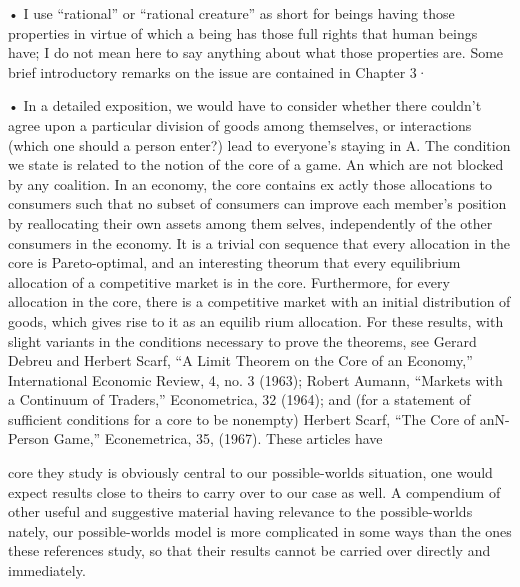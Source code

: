 \documentclass[11pt,openany]{book}
\begin{document}
{• I use ``rational'' or ``rational creature'' as short for beings having those properties in virtue of which a being has those full rights that human beings have; I do not mean here to say anything about what those properties are. Some brief introductory remarks on the issue are contained in Chapter 3·\par

• In a detailed exposition, we would have to consider whether there couldn't agree upon a particular division of goods among themselves, or interactions (which one should a person enter?) lead to everyone's staying in A. The condition we state is related to the notion of the core of a game. An which are not blocked by any coalition. In an economy, the core contains ex actly those allocations to consumers such that no subset of consumers can improve each member's position by reallocating their own assets among them selves, independently of the other consumers in the economy. It is a trivial con sequence that every allocation in the core is Pareto-optimal, and an interesting theorum that every equilibrium allocation of a competitive market is in the core. Furthermore, for every allocation in the core, there is a competitive market with an initial distribution of goods, which gives rise to it as an equilib rium allocation. For these results, with slight variants in the conditions necessary to prove the theorems, see Gerard Debreu and Herbert Scarf, ``A Limit Theorem on the Core of an Economy,'' International Economic Review, 4, no. 3 (1963); Robert Aumann, ``Markets with a Continuum of Traders,'' Econometrica, 32 (1964); and (for a statement of sufficient conditions for a core to be nonempty) Herbert Scarf, ``The Core of anN-Person Game,'' Econemetrica, 35, (1967). These articles have\par

core they study is obviously central to our possible-worlds situation, one would expect results close to theirs to carry over to our case as well. A compendium of other useful and suggestive material having relevance to the possible-worlds nately, our possible-worlds model is more complicated in some ways than the ones these references study, so that their results cannot be carried over directly and immediately.\par

}
\end{document}
